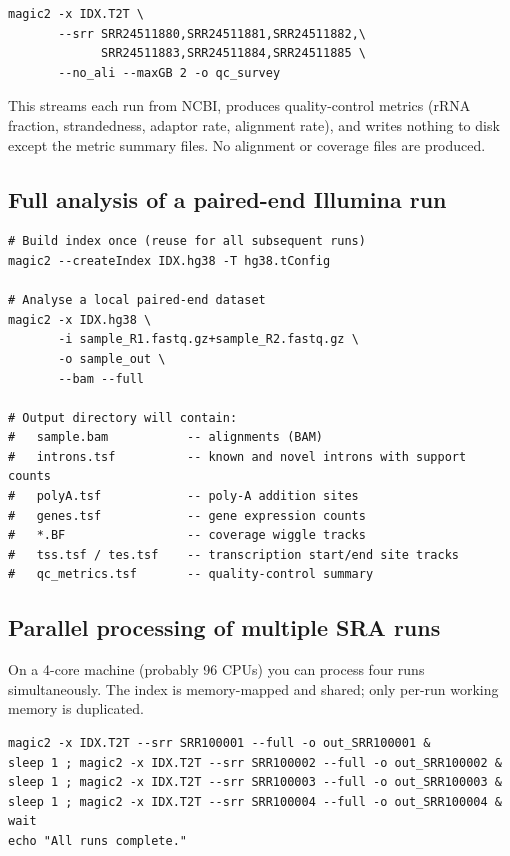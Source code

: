 \documentclass[11pt]{article}
\begin{document}
\begin{lstlisting}
magic2 -x IDX.T2T \
       --srr SRR24511880,SRR24511881,SRR24511882,\
             SRR24511883,SRR24511884,SRR24511885 \
       --no_ali --maxGB 2 -o qc_survey
\end{lstlisting}

This streams each run from NCBI, produces quality-control metrics
(rRNA fraction, strandedness, adaptor rate, alignment rate), and
writes nothing to disk except the metric summary files.  No alignment
or coverage files are produced.

\subsection{Full analysis of a paired-end Illumina run}

\begin{lstlisting}
# Build index once (reuse for all subsequent runs)
magic2 --createIndex IDX.hg38 -T hg38.tConfig

# Analyse a local paired-end dataset
magic2 -x IDX.hg38 \
       -i sample_R1.fastq.gz+sample_R2.fastq.gz \
       -o sample_out \
       --bam --full

# Output directory will contain:
#   sample.bam           -- alignments (BAM)
#   introns.tsf          -- known and novel introns with support counts
#   polyA.tsf            -- poly-A addition sites
#   genes.tsf            -- gene expression counts
#   *.BF                 -- coverage wiggle tracks
#   tss.tsf / tes.tsf    -- transcription start/end site tracks
#   qc_metrics.tsf       -- quality-control summary
\end{lstlisting}

\subsection{Parallel processing of multiple SRA runs}

On a 4-core machine (probably 96 CPUs) you can process four runs simultaneously.  The
index is memory-mapped and shared; only per-run working memory is
duplicated.

\begin{lstlisting}
magic2 -x IDX.T2T --srr SRR100001 --full -o out_SRR100001 &
sleep 1 ; magic2 -x IDX.T2T --srr SRR100002 --full -o out_SRR100002 &
sleep 1 ; magic2 -x IDX.T2T --srr SRR100003 --full -o out_SRR100003 &
sleep 1 ; magic2 -x IDX.T2T --srr SRR100004 --full -o out_SRR100004 &
wait
echo "All runs complete."
\end{lstlisting}
\end{document}
